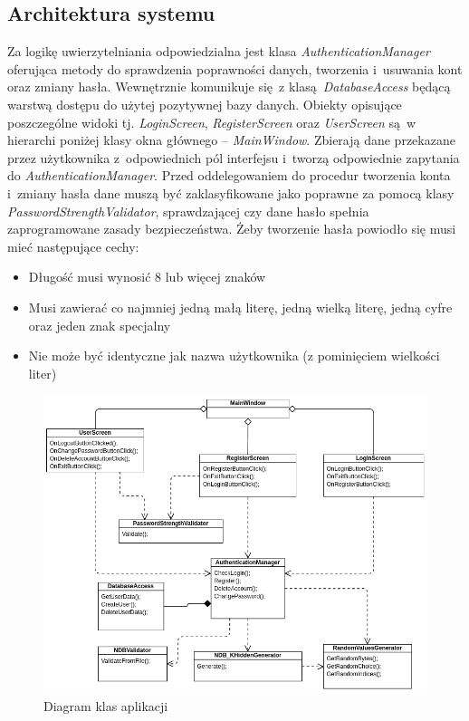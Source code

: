 \subsection{Architektura systemu}
Za logikę uwierzytelniania odpowiedzialna jest klasa \textit{AuthenticationManager} oferująca metody do sprawdzenia poprawności danych, tworzenia i~usuwania kont oraz zmiany hasła. Wewnętrznie komunikuje się z klasą \textit{DatabaseAccess} będącą warstwą dostępu do użytej pozytywnej bazy danych.
Obiekty opisujące poszczególne widoki tj. \textit{LoginScreen}, \textit{RegisterScreen} oraz \textit{UserScreen} są w hierarchi poniżej klasy okna głównego -- \textit{MainWindow}. Zbierają dane przekazane przez użytkownika z~odpowiednich pól interfejsu i~tworzą odpowiednie 
zapytania do \textit{AuthenticationManager}.
Przed oddelegowaniem do procedur tworzenia konta i~zmiany hasła dane muszą być zaklasyfikowane jako poprawne za pomocą klasy \textit{PasswordStrengthValidator}, sprawdzającej czy dane hasło spełnia zaprogramowane zasady bezpieczeństwa.
Żeby tworzenie hasła powiodło się musi mieć następujące cechy:
\begin{itemize}
    \item Długość musi wynosić 8 lub więcej znaków
    \item Musi zawierać co najmniej jedną małą literę, jedną wielką literę, jedną cyfre oraz jeden znak specjalny
    \item Nie może być identyczne jak nazwa użytkownika (z pominięciem wielkości liter)
\end{itemize}

\begin{figure}[h]
    \includegraphics[width = 15.5cm]{img/diagrams/class.png}
    \centering
    \caption{Diagram klas aplikacji}
    \label{img:class}
\end{figure}



